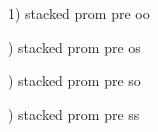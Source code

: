 \documentclass{article}
\begin{document}

1) stacked prom  pre oo

\begin{center}

\end{center}

) stacked prom pre os
\begin{center}

\end{center}

) stacked prom pre so
\begin{center}

\end{center}

) stacked prom pre ss
\begin{center}

\end{center}
\end{document}
